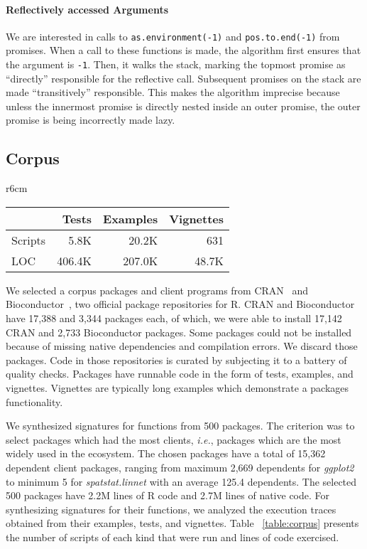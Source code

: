 \documentclass[review,nonacm,screen,acmsmall,anonymous=true]{acmart}
\newcommand{\code}[1]{\lstinline |#1|\xspace}
\begin{document}
\paragraph{Reflectively accessed Arguments}

We are interested in calls to \code{as.environment(-1)} and
\code{pos.to.end(-1)} from promises. When a call to these functions is made, the
algorithm first ensures that the argument is \code{-1}. Then, it walks the
stack, marking the topmost promise as ``directly'' responsible for the
reflective call. Subsequent promises on the stack are made ``transitively''
responsible. This makes the algorithm imprecise because unless the innermost
promise is directly nested inside an outer promise, the outer promise is being
incorrectly made lazy.


\subsection{Corpus}\label{sec:corpus}

\begin{wraptable}{r}{6cm}
  \vspace{-3mm}
  \small
  \centering
  \caption{Synthesis Corpus}\label{table:corpus}
  \vspace{-3mm}
  \begin{tabular}{lrrr}
    \toprule
    &\bf Tests&\bf Examples&\bf Vignettes\\
    \midrule
    {Scripts}&5.8K&20.2K&631\\
    \midrule
    {LOC}&406.4K&207.0K&48.7K\\
    \bottomrule
  \end{tabular}
\end{wraptable}%

We selected a corpus packages and client programs
from CRAN~\cite{ligges2017} and Bioconductor~\cite{bioc}, two
official package repositories for R. CRAN and Bioconductor have 17,388 and 3,344
packages each, of which, we were able to install 17,142 CRAN and 2,733
Bioconductor packages. Some packages could not be installed because of missing
native dependencies and compilation errors. We discard those packages. Code in
those repositories is curated by subjecting it to a battery of quality checks.
Packages have runnable code in the form of tests, examples, and vignettes.
Vignettes are typically long examples which demonstrate a packages
functionality.

We synthesized signatures for functions from 500 packages. The criterion was to
select packages which had the most clients, \emph{i.e.}, packages which are the
most widely used in the ecosystem. The chosen packages have a total of 15,362
dependent client packages, ranging from maximum 2,669 dependents for
\emph{ggplot2} to minimum 5 for \emph{spatstat.linnet} with an average 125.4
dependents. The selected 500 packages have 2.2M lines of R code and 2.7M lines
of native code. For synthesizing signatures for their functions, we analyzed the
execution traces obtained from their examples, tests, and vignettes. Table
~\ref{table:corpus} presents the number of scripts of each kind that were run
and lines of code exercised.
\end{document}
